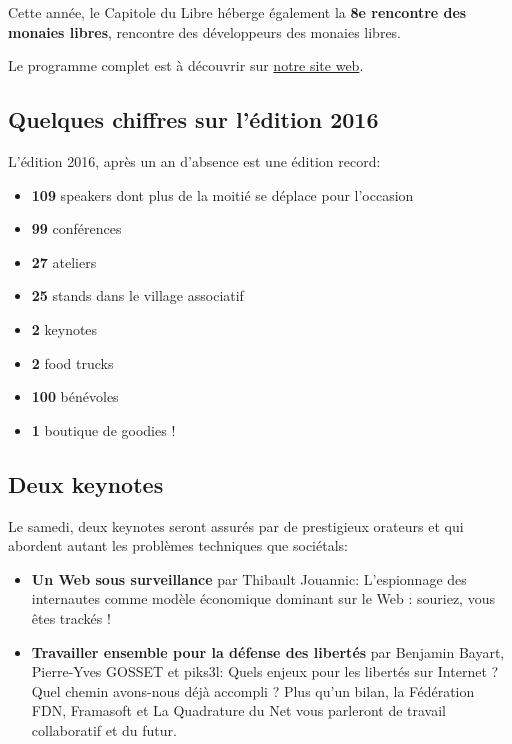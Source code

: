 Cette année, le Capitole du Libre héberge également la \textbf{8e rencontre des monaies libres}, rencontre des développeurs des monaies libres.

Le programme complet est à découvrir sur \href{https://2016.capitoledulibre.org/programme.html}{notre site web}.

\subsection{Quelques chiffres sur l'édition 2016}

L'édition 2016, après un an d'absence est une édition record:

\begin{itemize}[label=$\bullet$]
\item \textbf{109} speakers dont plus de la moitié se déplace pour l'occasion
\item \textbf{99} conférences
\item \textbf{27} ateliers
\item \textbf{25} stands dans le village associatif
\item \textbf{2} keynotes
\item \textbf{2} food trucks
\item \textbf{100} bénévoles
\item \textbf{1} boutique de goodies !
\end{itemize}

\subsection{Deux keynotes}

Le samedi, deux keynotes seront assurés par de prestigieux orateurs et qui abordent autant les problèmes techniques que sociétals:

\begin{itemize}[label=$\bullet$]
\item \textbf{Un Web sous surveillance} par Thibault Jouannic: L'espionnage des internautes comme modèle économique dominant sur le Web : souriez, vous êtes trackés !
\item \textbf{Travailler ensemble pour la défense des libertés} par Benjamin Bayart, Pierre-Yves GOSSET et piks3l: Quels enjeux pour les libertés sur Internet ? Quel chemin avons-nous déjà accompli ? Plus qu'un bilan, la Fédération FDN, Framasoft et La Quadrature du Net vous parleront de travail collaboratif et du futur.
\end{itemize}

